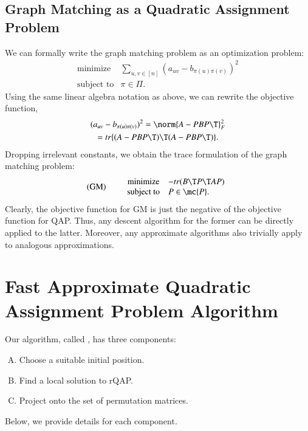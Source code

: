 \documentclass[preprint,11pt]{elsarticle}
\begin{document}
\subsection{Graph Matching as a Quadratic Assignment Problem}

We can formally write the graph matching problem as an optimization problem:
\begin{equation*}
\begin{array}{cl}
			\text{minimize}   &\sum_{u,v \in [n]} (a_{uv}-b_{\pi(u)\pi(v)})^2 \\
			\text{subject to}  &\pi \in \Pi.   
\end{array}\label{eq:GM}
\end{equation*}
Using the same linear algebra notation as above, we can rewrite the objective function, 
\begin{multline} \label{eq:equiv}
(a_{uv}-b_{\pi(u)\pi(v)})^2 = \norm{A - PBP\T}_F^2 \\ = tr \{ (A - PBP\T)\T (A - PBP\T)\}.
\end{multline}
Dropping irrelevant constants, we obtain the trace formulation of the graph matching problem:
\begin{equation}
\text{(GM)} \qquad  
\begin{array}{cl}
			\text{minimize}   & - tr(B\T P\T AP) \\
			\text{subject to}  &P \in \mc{P}.   
\end{array}\label{eq:GM}
\end{equation}
Clearly, the objective function for GM is just the negative of the objective function for QAP. Thus, any descent algorithm for the former can be directly applied to the latter.  Moreover, any approximate algorithms also trivially apply to analogous approximations.





\section{Fast Approximate Quadratic Assignment Problem Algorithm} %
\label{sec:FAQ}


Our algorithm, called \FAQ, has three components:
\begin{enumerate}[A.]
	\item Choose a suitable initial position. %
	\item Find a local solution to rQAP. %
	\item Project onto the set of permutation matrices. %
\end{enumerate}
Below, we provide details for each component.
\end{document}
